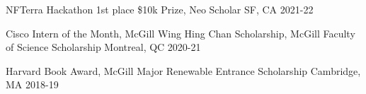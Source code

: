 



\begin{cvhonors}



  \cvhonor
  {NFTerra Hackathon 1st place \$10k Prize, Neo Scholar} %
  {} %
  {SF, CA} %
  {2021-22} %

  
  \cvhonor
  {Cisco Intern of the Month, McGill Wing Hing Chan Scholarship, McGill Faculty of Science Scholarship} %
  {} %
  {Montreal, QC} %
  {2020-21} %
  

    \cvhonor
    {Harvard Book Award, McGill Major Renewable Entrance Scholarship} %
    {} %
    {Cambridge, MA} %
    {2018-19} %


% 

\end{cvhonors}


